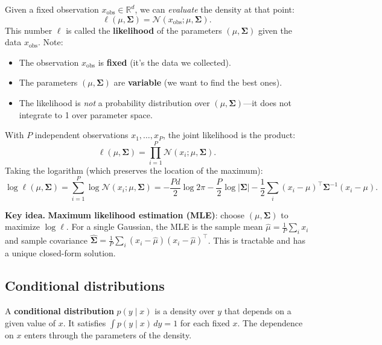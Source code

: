 \documentclass[11pt]{article}
\theoremstyle{definition}
\theoremstyle{plain}
\theoremstyle{remark}
\newcommand{\R}{\mathbb{R}}
\newcommand{\Sv}{\boldsymbol{\Sigma}}
\newenvironment{keyidea}{\par\medskip\noindent\textbf{Key idea.} }{\par\medskip}
\begin{document}
Given a fixed observation $x_{\mathrm{obs}}\in\R^d$, we can \emph{evaluate} the density at that point:
\begin{equation}
  \ell(\mu,\Sv) = \mathcal{N}(x_{\mathrm{obs}};\mu,\Sv).
\end{equation}
This number $\ell$ is called the \textbf{likelihood} of the parameters $(\mu,\Sv)$ given the data $x_{\mathrm{obs}}$. Note:
\begin{itemize}[leftmargin=*,itemsep=2pt]
  \item The observation $x_{\mathrm{obs}}$ is \textbf{fixed} (it's the data we collected).
  \item The parameters $(\mu,\Sv)$ are \textbf{variable} (we want to find the best ones).
  \item The likelihood is \emph{not} a probability distribution over $(\mu,\Sv)$---it does not integrate to 1 over parameter space.
\end{itemize}

With $P$ independent observations $x_1,\dots,x_P$, the joint likelihood is the product:
\begin{equation}
  \ell(\mu,\Sv) = \prod_{i=1}^P \mathcal{N}(x_i;\mu,\Sv).
\end{equation}
Taking the logarithm (which preserves the location of the maximum):
\begin{equation}
  \log\ell(\mu,\Sv) = \sum_{i=1}^P \log\mathcal{N}(x_i;\mu,\Sv) = -\frac{Pd}{2}\log 2\pi - \frac{P}{2}\log|\Sv| - \frac{1}{2}\sum_i (x_i-\mu)^\top\Sv^{-1}(x_i-\mu).
\end{equation}

\begin{keyidea}
\textbf{Maximum likelihood estimation (MLE)}: choose $(\mu,\Sv)$ to maximize $\log\ell$. For a single Gaussian, the MLE is the sample mean $\hat{\mu}=\frac{1}{P}\sum_i x_i$ and sample covariance $\hat{\Sv}=\frac{1}{P}\sum_i (x_i-\hat{\mu})(x_i-\hat{\mu})^\top$. This is tractable and has a unique closed-form solution.
\end{keyidea}

\subsection{Conditional distributions}

A \textbf{conditional distribution} $p(y\mid x)$ is a density over $y$ that depends on a given value of $x$. It satisfies $\int p(y\mid x)\,dy=1$ for each fixed $x$. The dependence on $x$ enters through the parameters of the density.
\end{document}
